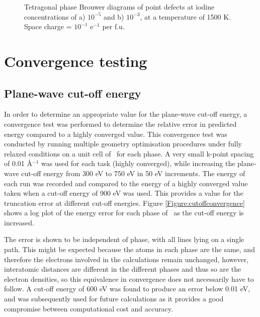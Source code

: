 \begin{figure}[ht]
\begin{center}
		\caption{Tetragonal phase Brouwer diagrams of point defects at iodine concentrations of a) $10^{-5}$ and b) $10^{-3}$, at a temperature of 1500 K. Space charge = $10^{-1}$ e$^{-1}$ per f.u.}
		\label{figure:spacechargeexample}
	\end{center}
\end{figure}

\section{Convergence testing} \label{section:convergence}

\subsection{Plane-wave cut-off energy}

In order to determine an appropriate value for the plane-wave cut-off energy, a convergence test was performed to determine the relative error in predicted energy compared to a highly converged value. This convergence test was conducted by running multiple geometry optimisation procedures under fully relaxed conditions on a unit cell of \zirconia\ for each phase. A very small k-point spacing of 0.01 \r{A}$^{-1}$ was used for each task (highly converged), while increasing the plane-wave cut-off energy from 300 eV to 750 eV in 50 eV increments. The energy of each run was recorded and compared to the energy of a highly converged value taken when a cut-off energy of 900 eV was used. This provides a value for the truncation error at different cut-off energies. Figure \ref{Figure:cutoffconvergence} shows a log plot of the energy error for each phase of \zirconia\ as the cut-off energy is increased. 

The error is shown to be independent of phase, with all lines lying on a single path. This might be expected because the atoms in each phase are the same, and therefore the electrons involved in the calculations remain unchanged, however, interatomic distances are different in the different phases and thus so are the electron densities, so this equivalence in convergence does not necessarily have to follow. A cut-off energy of 600 eV was found to produce an error below 0.01 eV, and was subsequently used for future calculations as it provides a good compromise between computational cost and accuracy.


